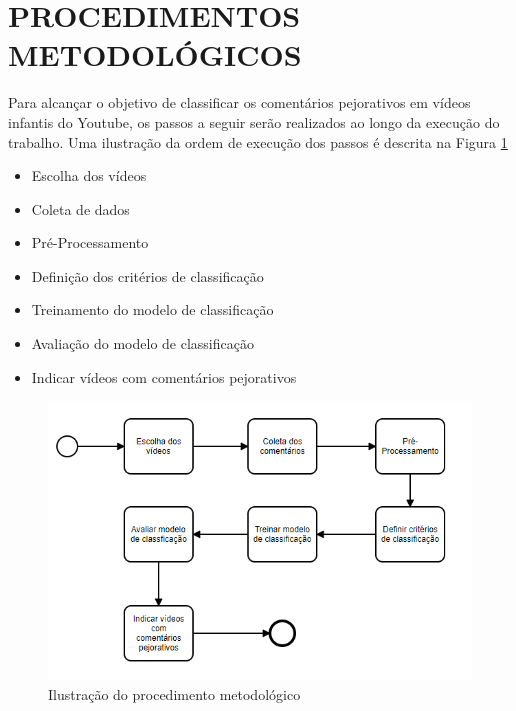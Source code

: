 \section{PROCEDIMENTOS METODOLÓGICOS}

Para alcançar o objetivo de classificar os comentários pejorativos em vídeos infantis do Youtube, os passos a seguir serão realizados ao longo da execução do trabalho.
Uma ilustração da ordem de execução dos passos é descrita na Figura \ref{fig:metodologia}

\begin{itemize}
    \item Escolha dos vídeos
    \item Coleta de dados
    \item Pré-Processamento
    \item Definição dos critérios de classificação
    \item Treinamento do modelo de classificação
    \item Avaliação do modelo de classificação
    \item Indicar vídeos com comentários pejorativos
\end{itemize}

\begin{figure}[H] %
	\caption{\label{fig:metodologia} Ilustração do procedimento metodológico}
	\begin{center}
	    \includegraphics[scale=0.7]{figuras/figura_6.png} %
	\end{center}
\end{figure}



